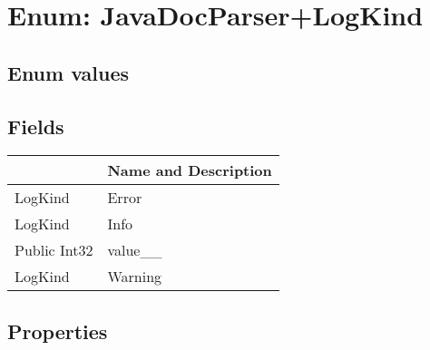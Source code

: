 \documentclass[11pt, oneside, a4paper]{book}
\begin{document}
\hypertarget{SoftwareEngineeringTools.{}Documentation.{}JavaDocParser+LogKind}{}
\section{Enum: JavaDocParser+LogKind}

\subsection{Enum values}

\subsection{Fields}
\begin{center}
\begin{tabular}{| p{3cm} | p{12cm} | }
\hline
\textbf{ } & \textbf{ Name and Description}\\
\hline
 LogKind &  Error\hypertarget{SoftwareEngineeringTools.{}Documentation.{}JavaDocParser+LogKind.{}Error}{}\\
\hline
 LogKind &  Info\hypertarget{SoftwareEngineeringTools.{}Documentation.{}JavaDocParser+LogKind.{}Info}{}\\
\hline
 Public  Int32 &  value\_\_\hypertarget{SoftwareEngineeringTools.{}Documentation.{}JavaDocParser+LogKind.{}value\_\_}{}\\
\hline
 LogKind &  Warning\hypertarget{SoftwareEngineeringTools.{}Documentation.{}JavaDocParser+LogKind.{}Warning}{}\\
\hline
\end{tabular}
\end{center}

\subsection{Properties}
\end{document}
